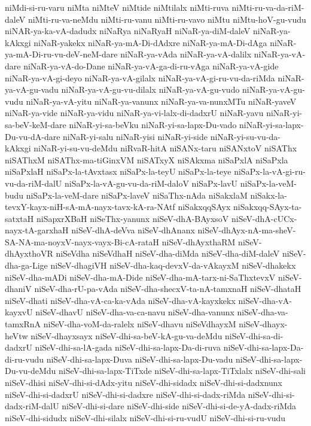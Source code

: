 {niMdi-si-ru-varu
niMta
niMteV
niMtide
niMtilalx
niMti-ruva
niMti-ru-va-da-riM-daleV
niMti-ru-va-neMdu
niMti-ru-vanu
niMti-ru-vavo
niMtu
niMtu-hoV-gu-vudu
niNAR-ya-ka-vA-dadudx
niNaRya
niNaRyaH
niNaR-ya-diM-daleV
niNaR-ya-kAkxgi
niNaR-yakekx
niNaR-ya-mA-Di-dAdxre
niNaR-ya-mA-Di-dAga
niNaR-ya-mA-Di-ru-vu-deV-neM-dare
niNaR-ya-vAda
niNaR-ya-vA-dalilx
niNaR-ya-vA-dare
niNaR-ya-vA-do-Dane
niNaR-ya-vA-ga-di-ru-vAga
niNaR-ya-vA-gide
niNaR-ya-vA-gi-deyo
niNaR-ya-vA-gilalx
niNaR-ya-vA-gi-ru-vu-da-riMda
niNaR-ya-vA-gu-vadu
niNaR-ya-vA-gu-vu-dilalx
niNaR-ya-vA-gu-vudo
niNaR-ya-vA-gu-vudu
niNaR-ya-vA-yitu
niNaR-ya-vanunx
niNaR-ya-va-nunxMTu
niNaR-yaveV
niNaR-ya-vide
niNaR-ya-vidu
niNaR-ya-vi-lalx-di-dadxrU
niNaR-yavu
niNaR-yi-sa-beV-keM-dare
niNaR-yi-sa-beVku
niNaR-yi-sa-lapx-Du-vado
niNaR-yi-sa-lapx-Du-vu-dA-dare
niNaR-yi-salu
niNaR-yisi
niNaR-yi-side
niNaR-yi-su-vu-da-kAkxgi
niNaR-yi-su-vu-deMdu
niRvaR-hitA
niSANx-taru
niSANxtoV
niSAThx
niSAThxM
niSAThx-ma-tiGinxVM
niSATxyX
niSAkxma
niSaPxlA
niSaPxla
niSaPxlaH
niSaPx-la-tAvxtasx
niSaPx-la-teyU
niSaPx-la-teye
niSaPx-la-vA-gi-ru-vu-da-riM-dalU
niSaPx-la-vA-gu-vu-da-riM-daloV
niSaPx-lavU
niSaPx-la-veM-budu
niSaPx-la-veM-dare
niSaPx-laveV
niSaThx-nAda
niSakxlaM
niSakx-la-tevxY-kayx-niH-sA-mA-nayx-tavx-kA-ra-NAtf
niSakxqqSAyx
niSakxqq-SAyx-ta-satxtaH
niSapxrXBaH
niSeThx-yanunx
niSeV-dhA-BAyxsoV
niSeV-dhA-cUCx-nayx-tA-garxhaH
niSeV-dhA-deVva
niSeV-dhAnanx
niSeV-dhAyx-nA-ma-sheV-SA-NA-ma-noyxV-nayx-vayx-Bi-cA-rataH
niSeV-dhAyxthaRM
niSeV-dhAyxthoVR
niSeVdha
niSeVdhaH
niSeV-dha-diMda
niSeV-dha-diM-daleV
niSeV-dha-ga-Lige
niSeV-dhagiVH
niSeV-dha-kaq-devxV-da-vAkayxM
niSeV-dhakekx
niSeV-dha-mADi
niSeV-dha-mA-Dide
niSeV-dha-mA-tarx-ni-SaThxtevxV
niSeV-dhaniV
niSeV-dha-rU-pa-vAda
niSeV-dha-shecxV-ta-nA-tamxnaH
niSeV-dhataH
niSeV-dhati
niSeV-dha-vA-ca-ka-vAda
niSeV-dha-vA-kayxkekx
niSeV-dha-vA-kayxvU
niSeV-dhavU
niSeV-dha-va-ca-navu
niSeV-dha-vanunx
niSeV-dha-va-tamxRnA
niSeV-dha-voM-da-ralelx
niSeV-dhavu
niSeVdhayxM
niSeV-dhayx-heVtw
niSeV-dhayxsayx
niSeV-dhi-sa-beV-kA-gu-va-deMdu
niSeV-dhi-sa-di-dadxrU
niSeV-dhi-sa-lA-gada
niSeV-dhi-sa-lapx-Da-di-ruva
niSeV-dhi-sa-lapx-Da-di-ru-vudu
niSeV-dhi-sa-lapx-Duva
niSeV-dhi-sa-lapx-Du-vadu
niSeV-dhi-sa-lapx-Du-vu-deMdu
niSeV-dhi-sa-lapx-TiTxde
niSeV-dhi-sa-lapx-TiTxlalx
niSeV-dhi-sali
niSeV-dhisi
niSeV-dhi-si-dAdx-yitu
niSeV-dhi-sidadx
niSeV-dhi-si-dadxnunx
niSeV-dhi-si-dadxrU
niSeV-dhi-si-dadxre
niSeV-dhi-si-dadx-riMda
niSeV-dhi-si-dadx-riM-dalU
niSeV-dhi-si-dare
niSeV-dhi-side
niSeV-dhi-si-de-yA-dadx-riMda
niSeV-dhi-sidudx
niSeV-dhi-silalx
niSeV-dhi-si-ru-vudU
niSeV-dhi-si-ru-vudu
}
